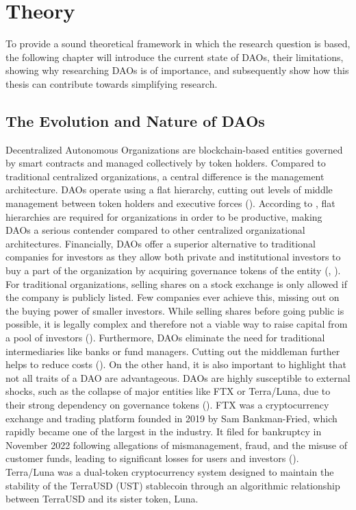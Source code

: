 \chapter{Theory}
To provide a sound theoretical framework in which the research question is based, the following chapter will introduce the current state of DAOs, their limitations, showing why researching DAOs is of importance, and subsequently show how this thesis can contribute towards simplifying research.

\section{The Evolution and Nature of DAOs}
Decentralized Autonomous Organizations are blockchain-based entities governed by smart contracts and managed collectively by token holders.
Compared to traditional centralized organizations, a central difference is the management architecture.
DAOs operate using a flat hierarchy, cutting out levels of middle management between token holders and executive forces (\cite{axelsen2024you}).
According to \textcite{cristini2003flat}, flat hierarchies are required for organizations in order to be productive, making DAOs a serious contender compared to other centralized organizational architectures. 
Financially, DAOs offer a superior alternative to traditional companies for investors as they allow both private and institutional investors to buy a part of the organization by acquiring governance tokens of the entity (\cite{hashemi2020icos}, \cite{blemus2020initial}).
For traditional organizations, selling shares on a stock exchange is only allowed if the company is publicly listed.
Few companies ever achieve this, missing out on the buying power of smaller investors.
While selling shares before going public is possible, it is legally complex and therefore not a viable way to raise capital from a pool of investors (\cite{boot2006entrepreneur}).
Furthermore, DAOs eliminate the need for traditional intermediaries like banks or fund managers.
Cutting out the middleman further helps to reduce costs (\cite{ofir2020ico}).
On the other hand, it is also important to highlight that not all traits of a DAO are advantageous.
DAOs are highly susceptible to external shocks, such as the collapse of major entities like FTX or Terra/Luna, due to their strong dependency on governance tokens (\cite{axelsen2024you}). 
FTX was a cryptocurrency exchange and trading platform founded in 2019 by Sam Bankman-Fried, which rapidly became one of the largest in the industry. It filed for bankruptcy in November 2022 following allegations of mismanagement, fraud, and the misuse of customer funds, leading to significant losses for users and investors (\cite{akyildirim2023understanding}). Terra/Luna was a dual-token cryptocurrency system designed to maintain the stability of the TerraUSD (UST) stablecoin through an algorithmic relationship between TerraUSD and its sister token, Luna.
